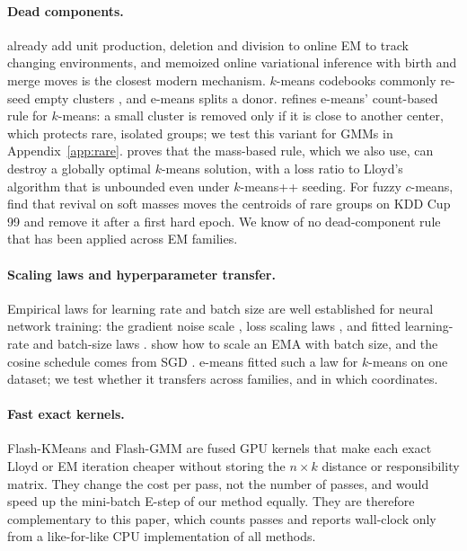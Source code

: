 \documentclass[10pt]{article}
\begin{document}
\paragraph{Dead components.} \citet{sato2000online} already add unit production, deletion and division to online EM
to track changing environments, and memoized online variational inference with birth and merge moves
\citep{hughes2013memoized} is the closest modern mechanism. $k$-means codebooks commonly re-seed empty clusters
\citep{johnson2019faiss,douze2024faiss}, and e-means splits a donor. \citet{weiss2026small} refines e-means'
count-based rule for $k$-means: a small cluster is removed only if it is close to another center, which protects rare,
isolated groups; we test this variant for GMMs in Appendix~\ref{app:rare}. \citet{assylbekov2026counterexamples}
proves that the mass-based rule, which we also use, can destroy a globally optimal $k$-means solution, with a loss
ratio to Lloyd's algorithm that is unbounded even under $k$-means++ seeding. For fuzzy $c$-means,
\citet{tiwari2026fuzzy} find that revival on soft masses moves the centroids of rare groups on KDD Cup 99 and remove
it after a first hard epoch. We know of no dead-component rule that has been applied across EM families.

\paragraph{Scaling laws and hyperparameter transfer.} Empirical laws for learning rate and batch size are well
established for neural network training: the gradient noise scale \citep{mccandlish2018empirical}, loss scaling laws
\citep{kaplan2020scaling}, and fitted learning-rate and batch-size laws \citep{deepseek2024llm}.
\citet{busbridge2023ema} show how to scale an EMA with batch size, and the cosine schedule comes from SGD
\citep{loshchilov2017sgdr}. e-means fitted such a law for $k$-means on one dataset; we test whether it transfers across
families, and in which coordinates.

\paragraph{Fast exact kernels.} Flash-KMeans \citep{yang2026flashkmeans} and Flash-GMM \citep{bloch2026flashgmm} are
fused GPU kernels that make each exact Lloyd or EM iteration cheaper without storing the $n \times k$ distance or
responsibility matrix. They change the cost per pass, not the number of passes, and would speed up the mini-batch
E-step of our method equally. They are therefore complementary to this paper, which counts passes and reports
wall-clock only from a like-for-like CPU implementation of all methods.
\end{document}
